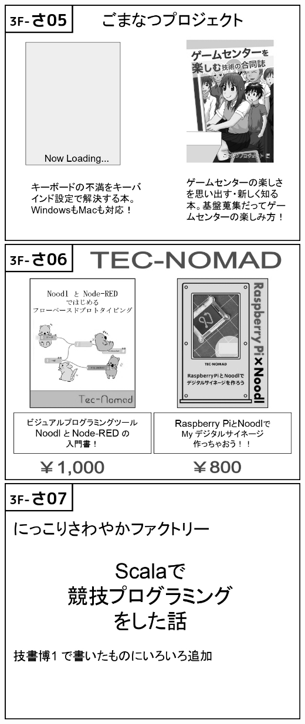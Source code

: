\begin{center}
\includegraphics[width=0.9\linewidth]{images/circle-appeals/3F-さ05.jpg}
\includegraphics[width=0.9\linewidth]{images/circle-appeals/3F-さ06.jpg}
\includegraphics[width=0.9\linewidth]{images/circle-appeals/3F-さ07.jpg}

\end{center}
